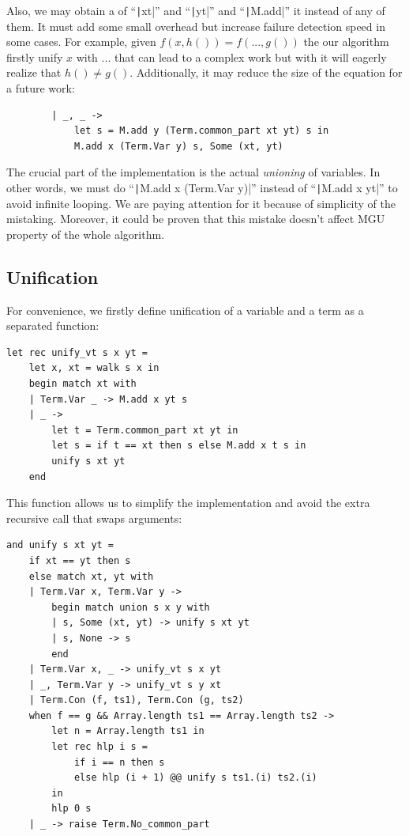 Also, we may obtain a \commonpart of ``\texttt|xt|'' and ``\texttt|yt|'' and ``\texttt|M.add|'' it instead of any of them. It must add some small overhead but increase failure detection speed in some cases. For example, given $f(x, h()) = f(..., g())$ the our algorithm firstly unify $x$ with $...$ that can lead to a complex work but with \commonpart it will eagerly realize that $h() \neq g()$. Additionally, it may reduce the \rhs size of the equation for a future work:
\begin{verbatim}
        | _, _ ->
            let s = M.add y (Term.common_part xt yt) s in
            M.add x (Term.Var y) s, Some (xt, yt)
\end{verbatim}

The crucial part of the \union implementation is the actual \textit{unioning} of variables. In other words, we must do ``\texttt|M.add x (Term.Var y)|'' instead of ``\texttt|M.add x yt|'' to avoid infinite looping. We are paying attention for it because of simplicity of the mistaking. Moreover, it could be proven that this mistake doesn't affect MGU property of the whole algorithm.


\subsection{Unification}

For convenience, we firstly define unification of a variable and a term as a separated function:
\begin{verbatim}
let rec unify_vt s x yt =
    let x, xt = walk s x in
    begin match xt with
    | Term.Var _ -> M.add x yt s
    | _ ->
        let t = Term.common_part xt yt in
        let s = if t == xt then s else M.add x t s in
        unify s xt yt
    end
\end{verbatim}

This function allows us to simplify the \unify implementation and avoid the extra recursive call that swaps arguments:
\begin{verbatim}
and unify s xt yt =
    if xt == yt then s
    else match xt, yt with
    | Term.Var x, Term.Var y ->
        begin match union s x y with
        | s, Some (xt, yt) -> unify s xt yt
        | s, None -> s
        end
    | Term.Var x, _ -> unify_vt s x yt
    | _, Term.Var y -> unify_vt s y xt
    | Term.Con (f, ts1), Term.Con (g, ts2)
    when f == g && Array.length ts1 == Array.length ts2 ->
        let n = Array.length ts1 in
        let rec hlp i s =
            if i == n then s
            else hlp (i + 1) @@ unify s ts1.(i) ts2.(i)
        in
        hlp 0 s
    | _ -> raise Term.No_common_part
\end{verbatim}


